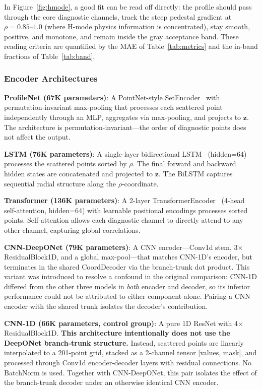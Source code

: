 \documentclass[a4paper,12pt]{article}
\begin{document}
In Figure~\ref{fig:hmode}, a good fit can be read off directly: the profile should pass through the core diagnostic channels, track the steep pedestal gradient at $\rho = 0.85$--$1.0$ (where H-mode physics information is concentrated), stay smooth, positive, and monotone, and remain inside the gray acceptance band. These reading criteria are quantified by the MAE of Table~\ref{tab:metrics} and the in-band fractions of Table~\ref{tab:band}.

\subsubsection{Encoder Architectures}

\textbf{ProfileNet (67K parameters)}: A PointNet-style SetEncoder~\cite{pointnet} with permutation-invariant max-pooling that processes each scattered point independently through an MLP, aggregates via max-pooling, and projects to $\mathbf{z}$. The architecture is permutation-invariant---the order of diagnostic points does not affect the output.

\textbf{LSTM (76K parameters)}: A single-layer bidirectional LSTM~\cite{lstm} (hidden=64) processes the scattered points sorted by $\rho$. The final forward and backward hidden states are concatenated and projected to $\mathbf{z}$. The BiLSTM captures sequential radial structure along the $\rho$-coordinate.

\textbf{Transformer (136K parameters)}: A 2-layer TransformerEncoder~\cite{transformer} (4-head self-attention, hidden=64) with learnable positional encodings processes sorted points. Self-attention allows each diagnostic channel to directly attend to any other channel, capturing global correlations.

\textbf{CNN-DeepONet (79K parameters)}: A CNN encoder---Conv1d stem, 3$\times$ ResidualBlock1D, and a global max-pool---that matches CNN-1D's encoder, but terminates in the shared CoordDecoder via the branch-trunk dot product. This variant was introduced to resolve a confound in the original comparison: CNN-1D differed from the other three models in \textit{both} encoder and decoder, so its inferior performance could not be attributed to either component alone. Pairing a CNN encoder with the shared trunk isolates the decoder's contribution.

\textbf{CNN-1D (66K parameters, control group)}: A pure 1D ResNet with 4$\times$ ResidualBlock1D. \textbf{This architecture intentionally does not use the DeepONet branch-trunk structure.} Instead, scattered points are linearly interpolated to a 201-point grid, stacked as a 2-channel tensor [values, mask], and processed through Conv1d encoder-decoder layers with residual connections. No BatchNorm is used. Together with CNN-DeepONet, this pair isolates the effect of the branch-trunk decoder under an otherwise identical CNN encoder.
\end{document}

